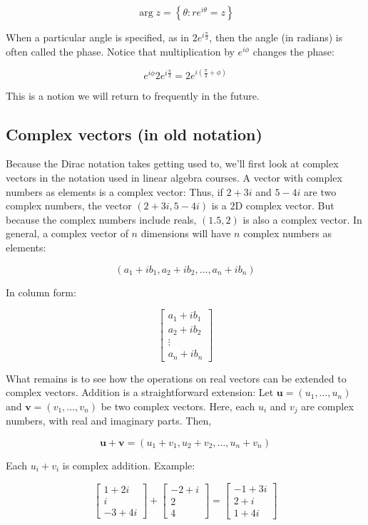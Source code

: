 \documentclass[main.tex]{subfiles}
\begin{document}
    $$
    \arg z=\left\{\theta: r e^{i \theta}=z\right\}
    $$
    
    When a particular angle is specified, as in $2 e^{i \frac{\pi}{3}}$, then the angle (in radians) is often called the phase. Notice that multiplication by $e^{i \phi}$ changes the phase:
    
    $$
    e^{i \phi} 2 e^{i \frac{\pi}{3}}=2 e^{i\left(\frac{\pi}{3}+\phi\right)}
    $$
    
    This is a notion we will return to frequently in the future.

\subsection{Complex vectors (in old notation)}

    Because the Dirac notation takes getting used to, we'll first look at complex vectors in the notation used in linear algebra courses. A vector with complex numbers as elements is a complex vector: Thus, if $2+3 i$ and $5-4 i$ are two complex numbers, the vector $(2+3 i, 5-4 i)$ is a $2 \mathrm{D}$ complex vector. But because the complex numbers include reals, $(1.5,2)$ is also a complex vector. In general, a complex vector of $n$ dimensions will have $n$ complex numbers as elements:
    
    $$
    \left(a_{1}+i b_{1}, a_{2}+i b_{2}, \ldots, a_{n}+i b_{n}\right)
    $$
    
    In column form:
    
    $$
    \left[\begin{array}{r}
    a_{1}+i b_{1} \\
    a_{2}+i b_{2} \\
    \vdots \\
    a_{n}+i b_{n}
    \end{array}\right]
    $$
    
    What remains is to see how the operations on real vectors can be extended to complex vectors. Addition is a straightforward extension: Let $\mathbf{u}=\left(u_{1}, \ldots, u_{n}\right)$ and $\mathbf{v}=\left(v_{1}, \ldots, v_{n}\right)$ be two complex vectors. Here, each $u_{i}$ and $v_{j}$ are complex numbers, with real and imaginary parts. Then,
    
    $$
    \mathbf{u}+\mathbf{v}=\left(u_{1}+v_{1}, u_{2}+v_{2}, \ldots, u_{n}+v_{n}\right)
    $$
    
    Each $u_{i}+v_{i}$ is complex addition. Example:
    
    $$
    \left[\begin{array}{r}
    1+2 i \\
    i \\
    -3+4 i
    \end{array}\right]+\left[\begin{array}{r}
    -2+i \\
    2 \\
    4
    \end{array}\right]=\left[\begin{array}{r}
    -1+3 i \\
    2+i \\
    1+4 i
    \end{array}\right]
    $$
    
\end{document}
